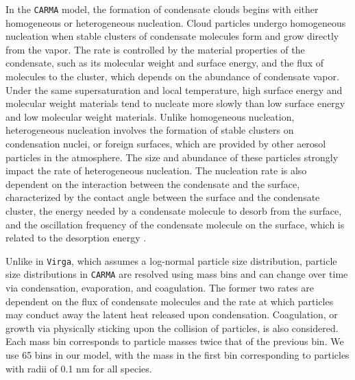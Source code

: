 \documentclass[twocolumn]{aastex63}
\begin{document}
In the \texttt{CARMA} model, the formation of condensate clouds begins with either homogeneous or heterogeneous nucleation. Cloud particles undergo homogeneous nucleation when stable clusters of condensate molecules form and grow directly from the vapor. The rate is controlled by the material properties of the condensate, such as its molecular weight and surface energy, and the flux of molecules to the cluster, which depends on the abundance of condensate vapor. Under the same supersaturation and local temperature, high surface energy and molecular weight materials tend to nucleate more slowly than low surface energy and low molecular weight materials. Unlike homogeneous nucleation, heterogeneous nucleation involves the formation of stable clusters on condensation nuclei, or foreign surfaces, which are provided by other aerosol particles in the atmosphere. The size and abundance of these particles strongly impact the rate of heterogeneous nucleation. The nucleation rate is also dependent on the interaction between the condensate and the surface, characterized by the contact angle between the surface and the condensate cluster, the energy needed by a condensate molecule to desorb from the surface, and the oscillation frequency of the condensate molecule on the surface, which is related to the desorption energy \citep[][]{Pruppacher1978}. 

 
Unlike in \texttt{Virga}, which assumes a log-normal particle size distribution, particle size distributions in \texttt{CARMA} are resolved using mass bins and can change over time via condensation, evaporation, and coagulation. The former two rates are dependent on the flux of condensate molecules and the rate at which particles may conduct away the latent heat released upon condensation. Coagulation, or growth via physically sticking upon the collision of particles, is also considered. Each mass bin corresponds to particle masses twice that of the previous bin. We use 65 bins in our model, with the mass in the first bin corresponding to particles with radii of 0.1 nm for all species. 
\end{document}
